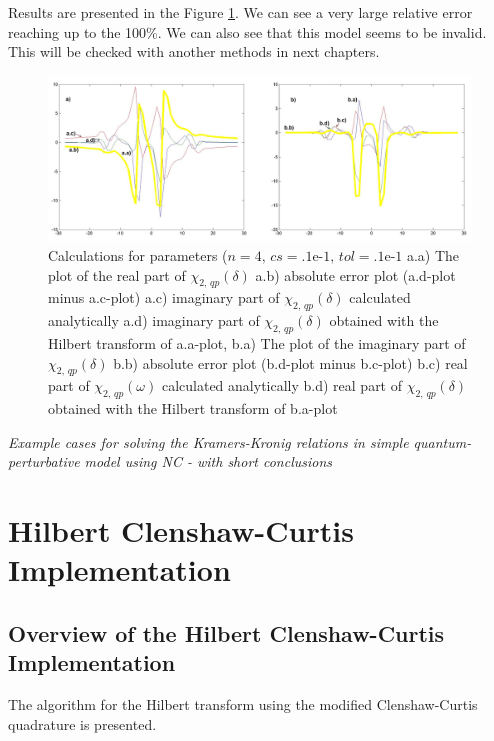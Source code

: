 \documentclass[12pt,twoside,a4paper]{article}
\numberwithin{equation}{subsection}
\numberwithin{figure}{subsection}
\begin{document}
Results are presented in the Figure \ref{fig:nc_quantum2}. We can see a very large relative error reaching up to the 100\%.
We can also see that this model seems to be invalid. This will be checked with another methods in next chapters. 

\begin{figure} 
  \includegraphics[width=150mm]{img/nc_quantum2.png}
  \caption{Calculations for parameters ($n=4, \,cs=\mbox{.1e-1}, \,tol=\mbox{.1e-1}$
     a.a) The plot of the real part of ${\chi_{2, \,qp}}(\delta )$
     a.b) absolute error plot (a.d-plot minus a.c-plot) 
     a.c) imaginary part of ${\chi_{2, \,qp}}(\delta )$ calculated analytically 
     a.d) imaginary part of ${\chi_{2, \,qp}}(\delta )$ obtained with the Hilbert transform of a.a-plot, 
     b.a) The plot of the imaginary part of ${\chi_{2, \,qp}}(\delta )$ 
     b.b) absolute error plot (b.d-plot minus b.c-plot) 
     b.c) real part of $\chi_{2, \,qp} (\omega )$ calculated analytically 
     b.d) real part of ${\chi_{2, \,qp}}(\delta )$ obtained with the Hilbert transform of b.a-plot 
     \label{fig:nc_quantum2}
     }
\end{figure}

\textit{Example cases for solving the Kramers-Kronig relations in simple quantum-perturbative model using NC - with short
conclusions}

\section{Hilbert Clenshaw-Curtis Implementation} \label{chap:hcc}

\subsection{Overview of the Hilbert Clenshaw-Curtis Implementation} \label{chap:hcc_overview}

The algorithm for the Hilbert transform using the modified Clenshaw-Curtis quadrature is presented. 
\end{document}
